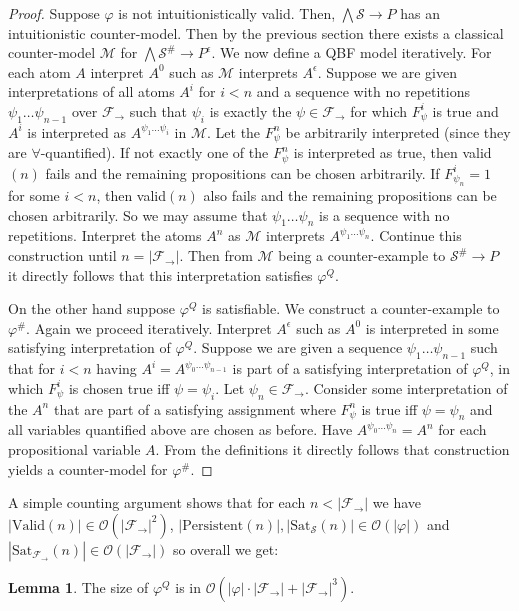 \documentclass[a4paper,12pt]{report}
\theoremstyle{definition}
\theoremstyle{definition}
\theoremstyle{definition}
\newtheorem{lemma}[theorem]{Lemma}
\theoremstyle{definition}
\theoremstyle{definition}
\theoremstyle{definition}
\theoremstyle{definition}
\begin{document}
	\begin{proof}
		Suppose $\varphi$ is not intuitionistically valid.
		Then, $\bigwedge\mathcal S\to P$ has an intuitionistic counter-model. Then by the previous section there exists a classical counter-model $\mathcal M$ for $\bigwedge\mathcal S^\#\to P^\epsilon$.
		We now define a QBF model iteratively.
		For each atom $A$ interpret $A^0$ such as $\mathcal M$ interprets $A^\epsilon$. Suppose we are given interpretations of all atoms $A^i$ for $i < n$ and a sequence with no repetitions $\psi_1\dots\psi_{n-1}$ over $\mathcal F_\to$ such that $\psi_i$ is exactly the $\psi\in\mathcal F_\to$ for which $F_{\psi}^i$ is true and $A^i$ is interpreted as $A^{\psi_1\dots\psi_i}$  in $\mathcal M$.
		Let the $F^{n}_\psi$ be arbitrarily interpreted (since they are $\forall$-quantified). If not exactly one of the $F^{n}_\psi$ is interpreted as true, then valid$(n)$ fails and the remaining propositions can be chosen arbitrarily. If $F^i_{\psi_n} = 1$ for some $i < n$, then valid$(n)$ also fails and the remaining propositions can be chosen arbitrarily.
		So we may assume that $\psi_1\dots\psi_n$ is a sequence with no repetitions.
		Interpret the atoms $A^n$ as $\mathcal M$ interprets $A^{\psi_1\dots\psi_n}$.
		Continue this construction until $n  = |\mathcal F_\to|$. Then from $\mathcal M$ being a counter-example to $\mathcal S^\#\to P$ it directly follows that this interpretation satisfies $\varphi^Q$.
		
		On the other hand suppose $\varphi^Q$ is satisfiable. We construct a counter-example to $\varphi^\#$.
		Again we proceed iteratively. Interpret $A^\epsilon$ such as $A^0$ is interpreted in some satisfying interpretation of $\varphi^Q$. Suppose we are given a sequence $\psi_1\dots \psi_{n-1}$ such that for $i<n$ having $A^i = A^{\psi_0\dots\psi_{n-1}}$ is part of a satisfying interpretation of $\varphi^Q$, in which $F^i_\psi$ is chosen true iff $\psi = \psi_i$. Let $\psi_n\in\mathcal F_\to$. Consider some interpretation of the $A^n$ that are part of a satisfying assignment where $F^n_\psi$ is true iff $\psi = \psi_n$ and all variables quantified above are chosen as before. Have $A^{\psi_0\dots\psi_n} = A^n$ for each propositional variable $A$. From the definitions it directly follows that construction yields a counter-model for $\varphi^\#$.
	\end{proof}
	
	A simple counting argument shows that for each $n < |\mathcal F_\to|$ we have $|\text{Valid}(n)|\in \mathcal O(|\mathcal F_\to|^2)$, $|\text{Persistent}(n)|, |\text{Sat}_{\mathcal S}(n)|\in \mathcal O(|\varphi|)$ and $|\text{Sat}_{\mathcal F_\to}(n)|\in \mathcal O(|\mathcal F_\to|)$ so overall we get:
	\begin{lemma}
		The size of $\varphi^Q$ is in $\mathcal O(|\varphi|\cdot|\mathcal F_\to| + |\mathcal F_\to|^3)$.
	\end{lemma}
	
\end{document}
